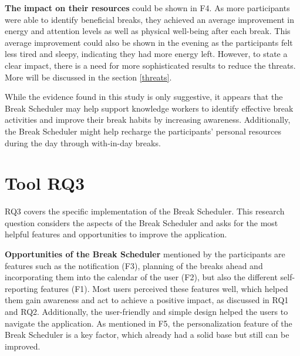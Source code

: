 \documentclass{hasel_thesis}
\begin{document}
\textbf{The impact on their resources} could be shown in F4. As more participants were able to identify beneficial breaks, they achieved an average improvement in energy and attention levels as well as physical well-being after each break. This average improvement could also be shown in the evening as the participants felt less tired and sleepy, indicating they had more energy left. However, to state a clear impact, there is a need for more sophisticated results to reduce the threats. More will be discussed in the section \ref{threats}.

While the evidence found in this study is only suggestive, it appears that the Break Scheduler may help support knowledge workers to identify effective break activities and improve their break habits by increasing awareness. Additionally, the Break Scheduler might help recharge the participants' personal resources during the day through with-in-day breaks.

\section{Tool RQ3} %
RQ3 covers the specific implementation of the Break Scheduler. This research question considers the aspects of the Break Scheduler and asks for the most helpful features and opportunities to improve the application.

\textbf{Opportunities of the Break Scheduler} mentioned by the participants are features such as the notification (F3), planning of the breaks ahead and incorporating them into the calendar of the user (F2), but also the different self-reporting features (F1). Most users perceived these features well, which helped them gain awareness and act to achieve a positive impact, as discussed in RQ1 and RQ2. Additionally, the user-friendly and simple design helped the users to navigate the application. As mentioned in F5, the personalization feature of the Break Scheduler is a key factor, which already had a solid base but still can be improved.
\end{document}
